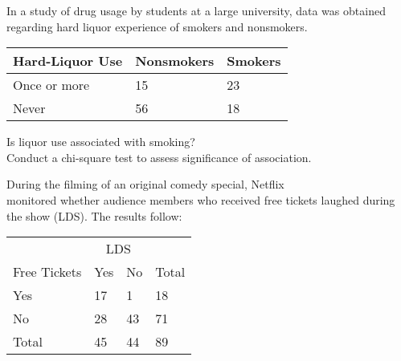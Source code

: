 \documentclass[11pt]{book}\usepackage[]{graphicx}\usepackage[]{color}
\begin{document}
\begin{exercises}
\begin{exercise} %

In a study of drug usage by students at a large university, data was obtained regarding hard liquor experience of smokers and nonsmokers.

{\small{
\begin{tabular}{@{} lll @{}} \hline
Hard-Liquor Use & Nonsmokers & Smokers \\ \hline
Once or more & 15 & 23 \\
Never        & 56 & 18 \\ \hline
\end{tabular}
}}

Is liquor use associated with smoking?  \\ Conduct a chi-square test to assess significance of association.

\end{exercise}
\begin{solution} %

\end{solution}

\begin{exercise} %

	During the filming of an original comedy special, Netflix \\ monitored whether audience members who received free tickets laughed during the show (LDS). The results follow:

\begin{table}[ht]
\centering
\begin{tabular}{@{} llll @{}} \hline
& \multicolumn{2}{c}{LDS} \\
Free Tickets & Yes & No & Total \\ \hline
Yes & 17 & 1  & 18 \\
No  & 28 & 43 & 71  \\ \hline
Total & 45 & 44 & 89 \\ \hline
\end{tabular}
\end{table}


\end{exercise}
\end{exercises}
\end{document}
